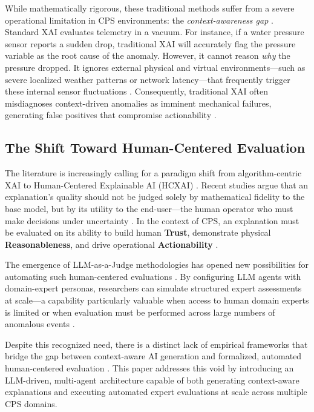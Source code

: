 \documentclass[a4paper,fleqn]{cas-dc}
\begin{document}
While mathematically rigorous, these traditional methods suffer from a severe operational limitation in CPS environments: the \textit{context-awareness gap} \cite{ref6, ref7}. Standard XAI evaluates telemetry in a vacuum. For instance, if a water pressure sensor reports a sudden drop, traditional XAI will accurately flag the pressure variable as the root cause of the anomaly. However, it cannot reason \textit{why} the pressure dropped. It ignores external physical and virtual environments---such as severe localized weather patterns or network latency---that frequently trigger these internal sensor fluctuations \cite{ref18, ref19}. Consequently, traditional XAI often misdiagnoses context-driven anomalies as imminent mechanical failures, generating false positives that compromise actionability \cite{ref8, ref14}.

\subsection{The Shift Toward Human-Centered Evaluation}
The literature is increasingly calling for a paradigm shift from algorithm-centric XAI to Human-Centered Explainable AI (HCXAI) \cite{ref1, ref12}. Recent studies argue that an explanation's quality should not be judged solely by mathematical fidelity to the base model, but by its utility to the end-user---the human operator who must make decisions under uncertainty \cite{ref17, ref_humanai}. In the context of CPS, an explanation must be evaluated on its ability to build human \textbf{Trust}, demonstrate physical \textbf{Reasonableness}, and drive operational \textbf{Actionability} \cite{ref38}.

The emergence of LLM-as-a-Judge methodologies has opened new possibilities for automating such human-centered evaluations \cite{ref_llm_judge}. By configuring LLM agents with domain-expert personas, researchers can simulate structured expert assessments at scale---a capability particularly valuable when access to human domain experts is limited or when evaluation must be performed across large numbers of anomalous events \cite{ref_batch_eval}.

Despite this recognized need, there is a distinct lack of empirical frameworks that bridge the gap between context-aware AI generation and formalized, automated human-centered evaluation \cite{ref6, ref10}. This paper addresses this void by introducing an LLM-driven, multi-agent architecture capable of both generating context-aware explanations and executing automated expert evaluations at scale across multiple CPS domains.
\end{document}
